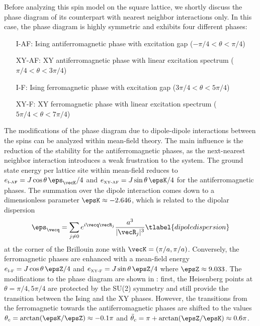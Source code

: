 Before analyzing this spin model on the square lattice, we
shortly discuss the phase diagram
of its counterpart with nearest neighbor interactions only.
In this case, the phase diagram is highly symmetric and
exhibits four different phases:
\begin{enumerate}[labelindent=2.55em,leftmargin=!]
    \item[I-AF:] Ising antiferromagnetic phase with excitation gap ($-\pi/4 < \theta < \pi/4$)
    \item[XY-AF:] XY antiferromagnetic phase with linear excitation spectrum ($\pi/4 < \theta < 3\pi/4$)
    \item[I-F:] Ising ferromagnetic phase with excitation gap ($3 \pi/4 < \theta < 5\pi/4$)
    \item[XY-F:] XY ferromagnetic phase with linear excitation spectrum ($5 \pi/4 < \theta < 7\pi/4$)
\end{enumerate}

\noindent
The modifications of the phase diagram due to dipole-dipole
interactions between the spins can be analyzed within mean-field theory. The
main influence is the reduction of the stability for the antiferromagnetic
phases, as the next-nearest neighbor interaction introduces a weak frustration
to the system. The ground state energy per lattice site within mean-field
reduces to $ e_{\mbox{\tiny I-AF}} = J \cos \theta \, \eps_\vecK/4$ and $e_{\mbox{\tiny XY-AF}} = J \sin \theta \, \epsK/4$
for the antiferromagnetic phases. The summation over the dipole interaction
comes down to a dimensionless parameter $\epsK \approx -2.646$, which is related to
the dipolar dispersion~\cite{Muller2010,Peter2012b,Syzranov2014,Peter2014}
%
\begin{align}
    \eps_\vecq = \sum_{j \neq 0} e^{i \vecq \vecR_j }\frac{a^3}{|\vecR_j|^3}
  \tlabel{dipoledispersion}
\end{align}
%
at the corner of the Brillouin zone with $\vecK = (\pi/a, \pi /a)$.
Conversely, the ferromagnetic phases are enhanced with a mean-field energy
$e_{\mbox{\tiny I-F}} = J \cos \theta \, \epsZ/4 $ and $ e_{\mbox{\tiny XY-F}} = J \sin \theta \, \epsZ/4$
where $\epsZ \approx 9.033$. The modifications to the
phase diagram are shown in : first, the Heisenberg points at
$\theta = \pi/4, 5 \pi/4$ are protected by the SU(2) symmetry and still
provide the transition between the Ising and the XY phases. However, the
transitions from the ferromagnetic towards the antiferromagnetic phases are
shifted to the values $\theta_{c}= \arctan(\epsK/\epsZ)
\approx -0.1 \pi$ and $\tilde{\theta}_c = \pi+ \arctan(\epsZ/\epsK)\approx 0.6 \pi$.


